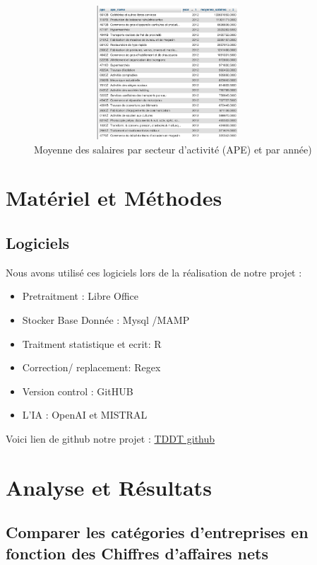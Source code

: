 \documentclass[mstat,12pt]{unswthesis}
\begin{document}
\begin{figure}
\centering
\includegraphics[width=10cm,height=5cm]{image_sql/ape_moyen.png}
\caption{Moyenne des salaires par secteur d'activité (APE) et par
année)}
\end{figure}

\newpage

\chapter{Matériel et Méthodes}\label{matuxe9riel-et-muxe9thodes}

\section{Logiciels}\label{logiciels}

Nous avons utilisé ces logiciels lors de la réalisation de notre projet
:

\begin{itemize}
\tightlist
\item
  Pretraitment : Libre Office
\item
  Stocker Base Donnée : Mysql /MAMP
\item
  Traitment statistique et ecrit: R
\item
  Correction/ replacement: Regex
\item
  Version control : GitHUB
\item
  L'IA : OpenAI et MISTRAL
\end{itemize}

\bigskip

Voici lien de github notre projet :
\href{https://github.com/serdarvarl/Project_DataBase_FR.git}{TDDT github}

\chapter{Analyse et Résultats}\label{analyse-et-ruxe9sultats}

\section{\texorpdfstring{\textbf{Comparer les catégories d'entreprises
en fonction des Chiffres d'affaires
nets}}{Comparer les catégories d'entreprises en fonction des Chiffres d'affaires nets}}\label{comparer-les-catuxe9gories-dentreprises-en-fonction-des-chiffres-daffaires-nets}
\end{document}
